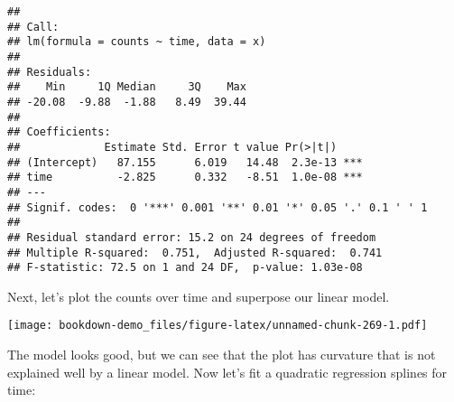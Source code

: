 \documentclass[]{book}
\newenvironment{Shaded}{\begin{snugshade}}{\end{snugshade}}
\newcommand{\KeywordTok}[1]{\textcolor[rgb]{0.13,0.29,0.53}{\textbf{#1}}}
\newcommand{\DataTypeTok}[1]{\textcolor[rgb]{0.13,0.29,0.53}{#1}}
\newcommand{\DecValTok}[1]{\textcolor[rgb]{0.00,0.00,0.81}{#1}}
\newcommand{\StringTok}[1]{\textcolor[rgb]{0.31,0.60,0.02}{#1}}
\newcommand{\CommentTok}[1]{\textcolor[rgb]{0.56,0.35,0.01}{\textit{#1}}}
\newcommand{\OperatorTok}[1]{\textcolor[rgb]{0.81,0.36,0.00}{\textbf{#1}}}
\newcommand{\NormalTok}[1]{#1}
\theoremstyle{definition}
\theoremstyle{definition}
\theoremstyle{definition}
\theoremstyle{remark}
\begin{document}
\begin{verbatim}
## 
## Call:
## lm(formula = counts ~ time, data = x)
## 
## Residuals:
##    Min     1Q Median     3Q    Max 
## -20.08  -9.88  -1.88   8.49  39.44 
## 
## Coefficients:
##             Estimate Std. Error t value Pr(>|t|)    
## (Intercept)   87.155      6.019   14.48  2.3e-13 ***
## time          -2.825      0.332   -8.51  1.0e-08 ***
## ---
## Signif. codes:  0 '***' 0.001 '**' 0.01 '*' 0.05 '.' 0.1 ' ' 1
## 
## Residual standard error: 15.2 on 24 degrees of freedom
## Multiple R-squared:  0.751,  Adjusted R-squared:  0.741 
## F-statistic: 72.5 on 1 and 24 DF,  p-value: 1.03e-08
\end{verbatim}

\begin{Shaded}
\end{Shaded}

Next, let's plot the counts over time and superpose our linear model.

\begin{Shaded}
\end{Shaded}

\texttt{[image: bookdown-demo\_files/figure-latex/unnamed-chunk-269-1.pdf]}

The model looks good, but we can see that the plot has curvature that is
not explained well by a linear model. Now let's fit a quadratic
regression splines for time:

\begin{Shaded}
\end{Shaded}
\end{document}

